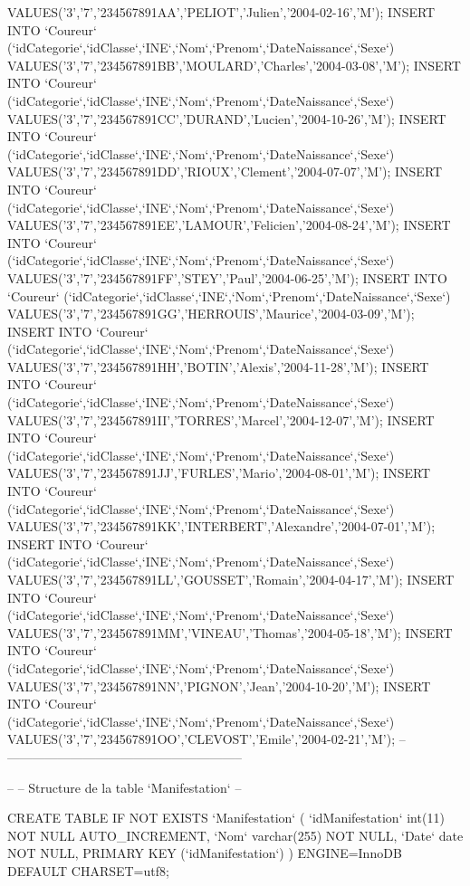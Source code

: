 \begin{DoxyCode}
       VALUES('3','7','234567891AA','PELIOT','Julien','2004-02-16','M');
INSERT INTO `Coureur` (`idCategorie`,`idClasse`,`INE`,`Nom`,`Prenom`,`DateNaissance`,`Sexe`)
       VALUES('3','7','234567891BB','MOULARD','Charles','2004-03-08','M');
INSERT INTO `Coureur` (`idCategorie`,`idClasse`,`INE`,`Nom`,`Prenom`,`DateNaissance`,`Sexe`)
       VALUES('3','7','234567891CC','DURAND','Lucien','2004-10-26','M');
INSERT INTO `Coureur` (`idCategorie`,`idClasse`,`INE`,`Nom`,`Prenom`,`DateNaissance`,`Sexe`)
       VALUES('3','7','234567891DD','RIOUX','Clement','2004-07-07','M');
INSERT INTO `Coureur` (`idCategorie`,`idClasse`,`INE`,`Nom`,`Prenom`,`DateNaissance`,`Sexe`)
       VALUES('3','7','234567891EE','LAMOUR','Felicien','2004-08-24','M');
INSERT INTO `Coureur` (`idCategorie`,`idClasse`,`INE`,`Nom`,`Prenom`,`DateNaissance`,`Sexe`)
       VALUES('3','7','234567891FF','STEY','Paul','2004-06-25','M');
INSERT INTO `Coureur` (`idCategorie`,`idClasse`,`INE`,`Nom`,`Prenom`,`DateNaissance`,`Sexe`)
       VALUES('3','7','234567891GG','HERROUIS','Maurice','2004-03-09','M');
INSERT INTO `Coureur` (`idCategorie`,`idClasse`,`INE`,`Nom`,`Prenom`,`DateNaissance`,`Sexe`)
       VALUES('3','7','234567891HH','BOTIN','Alexis','2004-11-28','M');
INSERT INTO `Coureur` (`idCategorie`,`idClasse`,`INE`,`Nom`,`Prenom`,`DateNaissance`,`Sexe`)
       VALUES('3','7','234567891II','TORRES','Marcel','2004-12-07','M');
INSERT INTO `Coureur` (`idCategorie`,`idClasse`,`INE`,`Nom`,`Prenom`,`DateNaissance`,`Sexe`)
       VALUES('3','7','234567891JJ','FURLES','Mario','2004-08-01','M');
INSERT INTO `Coureur` (`idCategorie`,`idClasse`,`INE`,`Nom`,`Prenom`,`DateNaissance`,`Sexe`)
       VALUES('3','7','234567891KK','INTERBERT','Alexandre','2004-07-01','M');
INSERT INTO `Coureur` (`idCategorie`,`idClasse`,`INE`,`Nom`,`Prenom`,`DateNaissance`,`Sexe`)
       VALUES('3','7','234567891LL','GOUSSET','Romain','2004-04-17','M');
INSERT INTO `Coureur` (`idCategorie`,`idClasse`,`INE`,`Nom`,`Prenom`,`DateNaissance`,`Sexe`)
       VALUES('3','7','234567891MM','VINEAU','Thomas','2004-05-18','M');
INSERT INTO `Coureur` (`idCategorie`,`idClasse`,`INE`,`Nom`,`Prenom`,`DateNaissance`,`Sexe`)
       VALUES('3','7','234567891NN','PIGNON','Jean','2004-10-20','M');
INSERT INTO `Coureur` (`idCategorie`,`idClasse`,`INE`,`Nom`,`Prenom`,`DateNaissance`,`Sexe`)
       VALUES('3','7','234567891OO','CLEVOST','Emile','2004-02-21','M');
-- --------------------------------------------------------

--
-- Structure de la table `Manifestation`
--

CREATE TABLE IF NOT EXISTS `Manifestation` (
  `idManifestation` int(11) NOT NULL AUTO\_INCREMENT,
  `Nom` varchar(255) NOT NULL,
  `Date` date NOT NULL,
  PRIMARY KEY (`idManifestation`)
) ENGINE=InnoDB DEFAULT CHARSET=utf8;


\end{DoxyCode}
